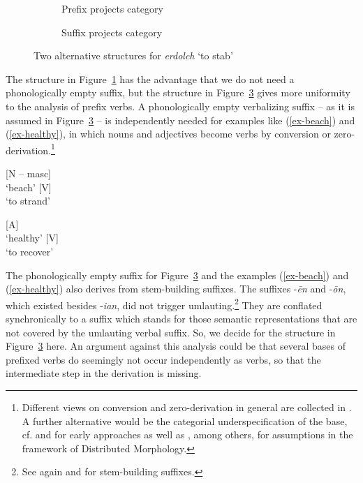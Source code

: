 \documentclass[output=paper
  ,nobabel
  ,draftmode
  ,colorlinks, citecolor=brown
]{langscibook}
\begin{document}
\begin{figure}
\begin{subfigure}[b]{.48\textwidth}
\centering
\scalebox{.92}{
\begin{forest}
	[V
		[V\textsuperscript{af} [er-]]
		[{[N -- masc]} [dolch, name=dolch]]
	]
\end{forest} }
\caption{Prefix projects category}\label{ex-erdolch-a}
\end{subfigure}
\begin{subfigure}[b]{.48\textwidth}
\centering
\scalebox{.92}{
\begin{forest}
	sm edges, empty nodes
	[V
		[[X\textsuperscript{af} [er-]]]
		[V
			[{[N -- masc]} [dolch]]
			[V\textsuperscript{af} [-$\emptyset$, name=empty]]
		]
	]
\end{forest} }
\caption{Suffix projects category}\label{ex-erdolch-b}
\end{subfigure}
\caption{Two alternative structures for \emph{erdolch} `to stab'}
\end{figure}

The structure in Figure~\ref{ex-erdolch-a} has the advantage that we do not need a phonologically empty suffix, but the structure in Figure~\ref{ex-erdolch-b} gives more uniformity to the analysis of prefix verbs. A phonologically empty verbalizing suffix – as it is assumed in Figure~\ref{ex-erdolch-b} – is independently needed for examples like (\ref{ex-beach}) and (\ref{ex-healthy}), in which nouns and adjectives become verbs by conversion or zero-derivation.\footnote{Different views on conversion and zero-derivation in general are collected in \citet{BauerValera2005}. A further alternative would be the categorial underspecification of the base, cf. \citet{Motsch1965} and \citet{BergenholtzMugdan1979} for early approaches as well as \citet{HarleyNoyer1999}, among others, for assumptions in the framework of Distributed Morphology.}

\eal\label{ex-beach}
\ex{} [N – masc]\\`beach'
\ex{} [V]\\`to strand'
\zl

\eal\label{ex-healthy}
\ex{} [A]\\`healthy'
\ex{} [V]\\`to recover'
\zl

\noindent 
The phonologically empty suffix for Figure~\ref{ex-erdolch-b} and the examples (\ref{ex-beach}) and (\ref{ex-healthy}) also derives from  stem-building suffixes. The suffixes -\emph{ēn} and -\emph{ōn}, which existed besides -\emph{ian}, did not trigger umlauting.\footnote{See again \textcites[90--93]{Sonderegger1997}[Section~5.3.7]{Sonderegger2003} and \citet*[217--220]{Schmidt2004} for  stem-building suffixes.} They are conflated synchronically to a suffix which stands for those semantic representations that are not covered by the umlauting verbal suffix. So, we decide for the structure in Figure~\ref{ex-erdolch-b} here. An argument against this analysis could be that several bases of prefixed verbs do seemingly not occur independently as verbs, so that the intermediate step in the derivation is missing.
\end{document}
